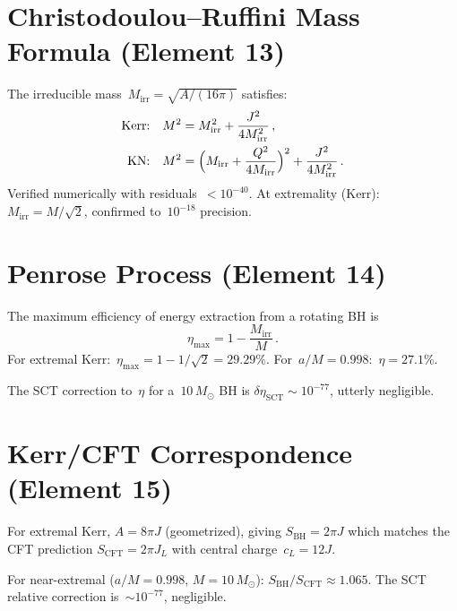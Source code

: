 \documentclass[11pt,a4paper]{article}
\newcommand{\Msun}{M_\odot}
\newcommand{\Mirr}{M_{\mathrm{irr}}}
\begin{document}
\section{Christodoulou--Ruffini Mass Formula (Element 13)}
\label{sec:CR}

The irreducible mass~$\Mirr = \sqrt{A/(16\pi)}$ satisfies:
\begin{align}
  \text{Kerr:}&\quad M^2 = \Mirr^2 + \frac{J^2}{4\Mirr^2}\,,  \\
  \text{KN:}&\quad M^2 = \Bigl(\Mirr + \frac{Q^2}{4\Mirr}\Bigr)^2
    + \frac{J^2}{4\Mirr^2}\,.
\end{align}
Verified numerically with residuals~$< 10^{-40}$.  At extremality
(Kerr):~$\Mirr = M/\sqrt{2}$, confirmed to~$10^{-18}$ precision.

\section{Penrose Process (Element 14)}\label{sec:penrose}

The maximum efficiency of energy extraction from a rotating BH is
\begin{equation}
  \eta_{\max} = 1 - \frac{\Mirr}{M}\,.
\end{equation}
For extremal Kerr:~$\eta_{\max} = 1 - 1/\sqrt{2} = 29.29\%$.
For~$a/M = 0.998$:~$\eta = 27.1\%$.

The SCT correction to~$\eta$ for a~$10\,\Msun$ BH is
$\delta\eta_{\mathrm{SCT}} \sim 10^{-77}$, utterly negligible.

\section{Kerr/CFT Correspondence (Element 15)}\label{sec:kerr-cft}

For extremal Kerr, $A = 8\pi J$ (geometrized), giving
$S_{\mathrm{BH}} = 2\pi J$ which matches the CFT prediction
$S_{\mathrm{CFT}} = 2\pi J_L$ with central charge~$c_L = 12J$.

For near-extremal ($a/M = 0.998$, $M = 10\,\Msun$):
$S_{\mathrm{BH}}/S_{\mathrm{CFT}} \approx 1.065$.
The SCT relative correction is~$\sim 10^{-77}$, negligible.
\end{document}
